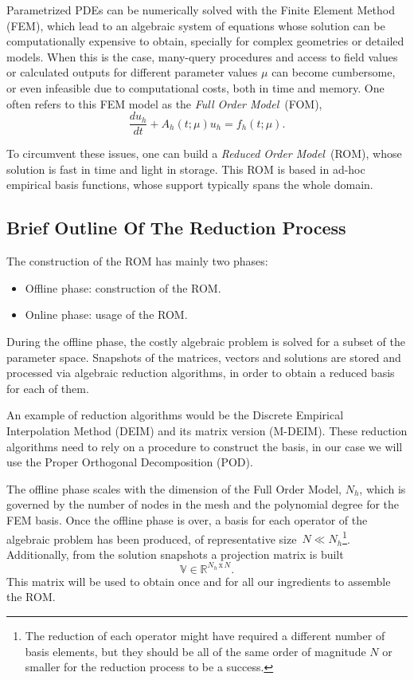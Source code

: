 \documentclass[a4paper, technote, compsoc]{IEEEtran}
\begin{document}
Parametrized PDEs can be numerically solved with the Finite Element Method (FEM), which lead to an algebraic system of equations whose solution can be computationally expensive to obtain, specially for complex geometries or detailed models.
When this is the case, many-query procedures and access to field values or calculated outputs for different parameter values $\mu$ can become cumbersome, or even infeasible due to computational costs, both in time and memory.
One often refers to this FEM model as the \textit{Full Order Model}~(FOM),
\begin{equation*}
   \frac{du_h}{dt} + A_h\left(t;\mu\right) u_h = f_h\left(t;\mu\right).
\end{equation*}

To circumvent these issues, one can build a \textit{Reduced Order Model}~(ROM), whose solution is fast in time and light in storage.
This ROM is based in ad-hoc empirical basis functions, whose support typically spans the whole domain. 

\subsection{Brief Outline Of The Reduction Process}
The construction of the ROM has mainly two phases:
\begin{itemize}
   \item Offline phase: construction of the ROM.
   \item Online phase: usage of the ROM.
\end{itemize}

During the offline phase, the costly algebraic problem is solved for a subset of the parameter space.
Snapshots of the matrices, vectors and solutions are stored and processed via algebraic reduction algorithms, in order to obtain a reduced basis for each of them.

An example of reduction algorithms would be the Discrete Empirical Interpolation Method (DEIM) and its matrix version (M-DEIM).
These reduction algorithms need to rely on a procedure to construct the basis, in our case we will use the Proper Orthogonal Decomposition (POD). 

The offline phase scales with the dimension of the Full Order Model, $N_h$, which is governed by the number of nodes in the mesh and the polynomial degree for the FEM basis.
Once the offline phase is over, a basis for each operator of the algebraic problem has been produced, of representative size~$N \ll N_h$\footnote{
The reduction of each operator might have required a different number of basis elements, but they should be all of the same order of magnitude $N$ or smaller for the reduction process to be a success.}.
Additionally, from the solution snapshots a projection matrix is built
\begin{equation*}
   \mathbb{V} \in \mathbb{R}^{N_h \,\text{x}\, N}.
\end{equation*} 
This matrix will be used to obtain once and for all our ingredients to assemble the ROM.
\end{document}
